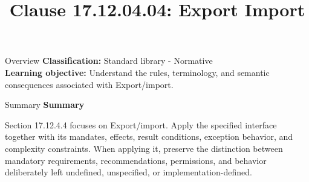 \documentclass[10pt,letterpaper]{article}
\title{Clause 17.12.04.04: Export Import}
\author{}
\date{}
\begin{document}
\maketitle
\begin{CornellOverviewBox}{Overview}
\textbf{Classification:} Standard library - Normative\\[2pt]
\textbf{Learning objective:} Understand the rules, terminology, and semantic consequences associated with Export/import.
\end{CornellOverviewBox}\begin{CornellSummaryBox}{Summary}
{\sffamily\bfseries\color{Accent} Summary}\par\vspace{3pt}Section 17.12.4.4 focuses on Export/import. Apply the specified interface together with its mandates, effects, result conditions, exception behavior, and complexity constraints. When applying it, preserve the distinction between mandatory requirements, recommendations, permissions, and behavior deliberately left undefined, unspecified, or implementation-defined.
\end{CornellSummaryBox}
\end{document}
